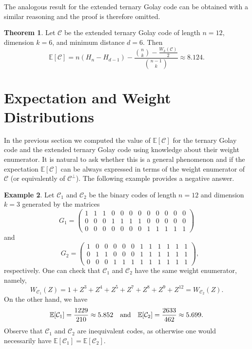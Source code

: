 \documentclass[11pt,a4paper,reqno,twoside]{article}
\theoremstyle{definition}
\newtheorem{theorem}{Theorem}[section]
\newtheorem{example}[theorem]{Example}
\newcommand{\E}{\mathbb{E}}
\newcommand{\mC}{\mathcal{C}}
\begin{document}
The analogous result for the extended ternary Golay code can be obtained with a similar reasoning
and the proof is therefore omitted.

\begin{theorem} \label{exp_extended_ternary_Golay}
    Let $\mC$ be the extended ternary Golay code of length $n=12$, dimension $k=6$, and minimum distance $d = 6$. Then
    \[
    \E[\mC] = n(H_n - H_{d-1}) - \frac{\binom{n}{k} - \frac{W_k(\mC)}{2}}{\binom{n-1}{k}} \approx 8.124.
    \]
\end{theorem}



\section{Expectation and Weight Distributions} \label{weight_distr_section}

In the previous section we computed the value of $\E[\mC]$ for the ternary Golay code and the extended ternary Golay code using knowledge about their weight enumerator. It is natural to ask whether this is a general phenomenon and if the expectation $\E[\mC]$ can be always expressed in terms of the weight enumerator of $\mC$ (or equivalently of $\mC^\perp$). The following example provides a negative answer. 

\begin{example} \label{example_wd_different_E} 
    Let $\mC_1$ and $\mC_2$ be the binary codes of length $n=12$ and dimension $k=3$ generated by the matrices
    \[
    G_1 = \begin{pmatrix}
    1 & 1 & 1 & 0 & 0 & 0 & 0 & 0 & 0 & 0 & 0 & 0 \\
    0 & 0 & 0 & 1 & 1 & 1 & 1 & 0 & 0 & 0 & 0 & 0 \\
    0 & 0 & 0 & 0 & 0 & 0 & 0 & 1 & 1 & 1 & 1 & 1
    \end{pmatrix}
    \]
    and
    \[
    \quad G_2 = \begin{pmatrix}
    1 & 0 & 0 & 0 & 0 & 0 & 1 & 1 & 1 & 1 & 1 & 1 \\
    0 & 1 & 1 & 0 & 0 & 0 & 1 & 1 & 1 & 1 & 1 & 1 \\
    0 & 0 & 0 & 1 & 1 & 1 & 1 & 1 & 1 & 1 & 1 & 1
    \end{pmatrix},
    \]
    respectively. One can check that $\mC_1$ and $\mC_2$ have the same weight enumerator, namely,
    \[
    W_{\mC_1}(Z) = 1 + Z^3 + Z^4 + Z^5 + Z^7 + Z^8 + Z^9 + Z^{12} = W_{\mC_2}(Z).
    \]
    On the other hand, we have 
    \[
        \mathbb{E}[\mC_1] = \frac{1229}{210} \approx 5.852 \quad \textnormal{and} \quad \mathbb{E}[\mC_2] = \frac{2633}{462} \approx 5.699.
    \]
    Observe that $\mC_1$ and $\mC_2$ are inequivalent codes, as otherwise one would necessarily have 
    $\E[\mC_1]=\E[\mC_2]$.
\end{example}
\end{document}
